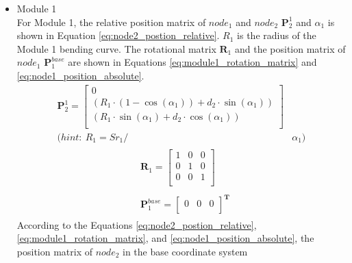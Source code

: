 \begin{itemize}
    \item Module 1 \\
    For Module 1, the relative position matrix of $node_1$ and $node_2$ $\textbf{P}_{2}^{1}$ and $\alpha_1$ is shown 
    in Equation \ref{eq:node2_postion_relative}. $R_1$ is the radius of the Module 1 bending curve. The rotational 
    matrix $\textbf{R}_{1}$ and the position matrix of $node_1$ $\textbf{P}_{1}^{base}$ are shown in Equations 
    \ref*{eq:module1_rotation_matrix} and \ref{eq:node1_position_absolute}.
    \begin{align}
        \textbf{P}_{2}^{1} = 
        \begin{bmatrix}
            0 \\
            (R_1\cdot(1-\cos(\alpha_1)) + d_2\cdot \sin(\alpha_1)) \\
            (R_1\cdot \sin(\alpha_1) + d_2\cdot \cos(\alpha_1)) \\
        \end{bmatrix}&
        \label{eq:node2_postion_relative} \\
        \nonumber (hint: \ R_1 = {Sr}_1/ &\alpha_1)
    \end{align}
    \vspace{-15mm}
    \begin{align}
        &\begin{aligned}
            \textbf{R}_{1} = 
            \begin{bmatrix}
                1 & 0 & 0 \\
                0 & 1 & 0 \\
                0 & 0 & 1 \\
            \end{bmatrix}
        \end{aligned}
        \label{eq:module1_rotation_matrix} \\
        &\begin{aligned}
            \textbf{P}_{1}^{base} = 
            \begin{bmatrix}
                0 & 0 & 0\\
            \end{bmatrix}^{\textbf{T}}
        \end{aligned}
        \label{eq:node1_position_absolute}
    \end{align}
    According to the Equations \ref{eq:node2_postion_relative}, \ref*{eq:module1_rotation_matrix}, and 
    \ref{eq:node1_position_absolute}, the position matrix of $node_{2}$ in the base coordinate system 

\end{itemize}
